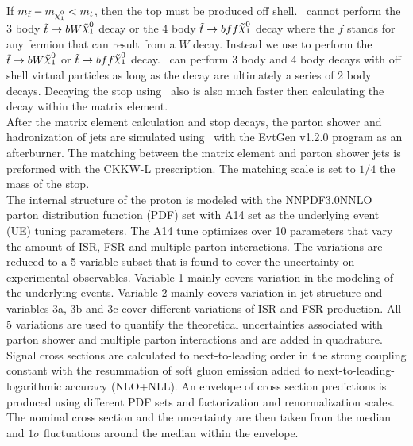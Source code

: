 \indent If $m_{\stop} - m_{\ninoone} < m_{t}$, then the top must be produced off shell.   \pythiaeight\ cannot perform the 3 body $\stop \rightarrow b W \ninoone$ decay or the 4 body $\stop \rightarrow b f f \ninoone$ decay where the $f$ stands for any fermion that can result from a $W$ decay.  Instead we use \madspin\cite{Madspin} to perform the $\stop \rightarrow b W \ninoone$ or $\stop \rightarrow b ff \ninoone$ decay.  \madspin\ can perform 3 body and 4 body decays with off shell virtual particles as long as the decay are ultimately a series of 2 body decays.  Decaying the stop using \madspin\ also is also much faster then calculating the decay within the matrix element.  \\ %

\indent After the matrix element calculation and stop decays, the parton shower and hadronization of jets are simulated using \pythiaeight\ with the {\sc EvtGen} v1.2.0 program as an afterburner.  The matching between the matrix element and parton shower jets is preformed with the CKKW-L prescription.   The matching scale is set to $1/4$ the mass of the stop. \\

\indent The internal structure of the proton is modeled with the NNPDF3.0NNLO parton distribution function (PDF) set \cite{NNPDF3.0} with A14 set as the underlying event (UE) tuning parameters\cite{Pythia8tunes}.  The A14 tune optimizes over 10 parameters that vary the amount of ISR, FSR and multiple parton interactions.  The variations are reduced to a 5 variable subset that is found to cover the uncertainty on experimental observables.  Variable 1 mainly covers variation in the modeling of the underlying events.  Variable 2 mainly covers variation in jet structure and variables 3a, 3b and 3c cover different variations of ISR and FSR production.  All 5 variations are used to quantify the theoretical uncertainties associated with parton shower and multiple parton interactions and are added in quadrature.\\

\indent Signal cross sections are calculated to next-to-leading order in the strong coupling constant with the resummation of soft gluon emission added to next-to-leading-logarithmic accuracy (NLO+NLL).\cite{stopXsec}  An envelope of cross section predictions is produced using different PDF sets and factorization and renormalization scales.  The nominal cross section and the uncertainty are then taken from the median and $1\sigma$ fluctuations around the median within the envelope.  \\

